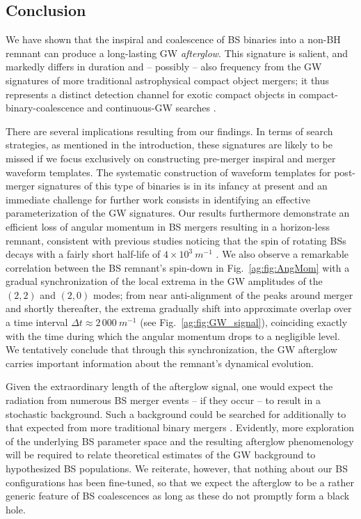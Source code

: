 \subsection{Conclusion}\label{ag:sec:conclusion}


We have shown that the inspiral and
coalescence of BS binaries into a non-BH remnant can produce a long-lasting GW {\it afterglow}. This signature is salient, and markedly differs in duration and -- possibly -- also
frequency from the GW signatures of more traditional astrophysical compact object mergers; it thus represents a distinct detection channel for exotic compact objects
in compact-binary-coalescence and continuous-GW searches \cite{LIGOScientific:2019yhl,KAGRA:2021una,LIGOScientific:2021jlr,LIGOScientific:2021oez,LIGOScientific:2022lsr,LIGOScientific:2022pjk,LIGOScientific:2021hvc,LIGOScientific:2021ozr}.

There are several implications resulting from our
findings. In terms of search strategies, as mentioned in the introduction, these signatures are likely to be missed if we focus exclusively on constructing pre-merger inspiral and merger waveform templates. The systematic construction of waveform templates for post-merger signatures of this type of binaries
is in its infancy at present and an immediate challenge
for further work consists in identifying an effective
parameterization of the GW signatures. Our results furthermore
demonstrate an efficient loss of angular momentum in BS mergers
resulting in a horizon-less remnant, consistent with previous studies noticing that the spin of rotating BSs decays with a fairly short half-life of $4\times 10^3~m^{-1}$ \cite{Sanchis-Gual:2019ljs}. We also observe
a remarkable correlation between the BS remnant's spin-down
in Fig.~\ref{ag:fig:AngMom} with a gradual synchronization
of the local extrema in the GW amplitudes of the $(2,2)$
and $(2,0)$ modes; from near anti-alignment of the
peaks around merger and shortly thereafter, the extrema
gradually shift into approximate overlap over a time
interval $\Delta t \approx 2\,000~m^{-1}$ (see
Fig.~\ref{ag:fig:GW_signal}), coinciding
exactly with the time during which the angular momentum
drops to a negligible level.
We tentatively conclude that through this synchronization,
the GW afterglow carries important information about the remnant's dynamical evolution.

Given the extraordinary length of the afterglow signal, one
would expect the radiation from numerous BS merger events
-- if they occur -- to result in a stochastic background.
Such a background could be searched for additionally
to that expected from more traditional binary mergers
\cite{Croon:2018ftb}. Evidently, more exploration of the
underlying BS parameter space and the resulting afterglow
phenomenology will be required to relate theoretical
estimates of the GW background to hypothesized BS populations.
We reiterate, however, that nothing about our BS configurations
has been fine-tuned, so that we expect the afterglow to be a
rather generic feature of BS coalescences as long as these do
not promptly form a black hole.


